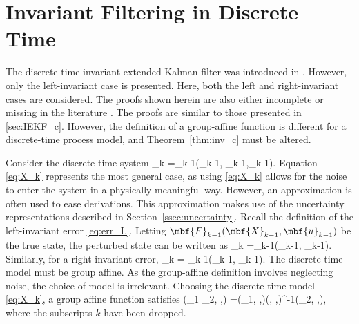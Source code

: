 \section{Invariant Filtering in Discrete Time}

The discrete-time invariant extended Kalman filter was introduced in \cite{Barrau2018}. However, only the left-invariant case is presented. Here, both the left and right-invariant cases are considered. The proofs shown herein are also either incomplete or missing in the literature \cite{Chauchat2018,persComm2017}. The proofs are similar to those presented in \ref{sec:IEKF_c}. However, the definition of a group-affine function is different for a discrete-time process model, and Theorem~\ref{thm:inv_c} must be altered. 

Consider the discrete-time system
\beq
	_k =_{k-1}(_{k-1}, _{k-1},_{k-1}). \label{eq:X_k}
\eeq
Equation \eqref{eq:X_k} represents the most general case, as using \eqref{eq:X_k} allows for the noise to enter the system in a physically meaningful way. However, an approximation is often used to ease derivations. This approximation makes use of the uncertainty representations described in Section~\ref{ssec:uncertainty}. Recall the definition of the left-invariant error \eqref{eq:err_L}. Letting $\mbf{F}_{k-1}(\mbf{X}_{k-1}, \mbf{u}_{k-1})$ be the true state, the perturbed state can be written as
\beq
	_k =_{k-1}(_{k-1}, _{k-1}). \label{eq:X_k_L} 
\eeq
Similarly, for a right-invariant error,
\beq
	_k = _{k-1}(_{k-1}, _{k-1}). \label{eq:X_k_R} 
\eeq
The discrete-time model must be group affine. As the group-affine definition involves neglecting noise, the choice of model is irrelevant. Choosing the discrete-time model \eqref{eq:X_k}, a group affine function satisfies 
\beq
	\left(_1 _2, ,\right) =\left(_1, ,\right)\left(, ,\right)^{-1}\left(_2, ,\right), \label{eq:inv_rel_dis}
\eeq
where the subscripts $k$ have been dropped. 

